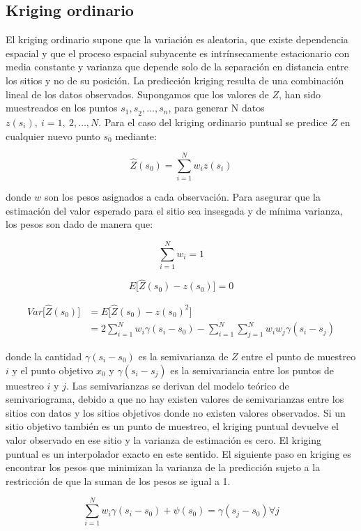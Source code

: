 \documentclass[11pt,b5paper,]{krantz}
\begin{document}
\hypertarget{kriging-ordinario}{%
\subsection{Kriging ordinario}\label{kriging-ordinario}}

El kriging ordinario supone que la variación es aleatoria, que existe dependencia espacial y que el proceso espacial subyacente es intrínsecamente estacionario con media constante y varianza que depende solo de la separación en distancia entre los sitios y no de su posición. La predicción kriging resulta de una combinación lineal de los datos observados. Supongamos que los valores de \(Z\), han sido muestreados en los puntos \(s_1{,s}_2,\ldots,s_n\), para generar N datos \(z(s_i),\ i=1,\ 2,\ldots, N\). Para el caso del kriging ordinario puntual se predice \(Z\) en cualquier nuevo punto \(s_0\) mediante:

\[\hat{Z}(s_0)=\sum_{i=1}^{N}{w_iz(s_i)}\]

donde \(w\) son los pesos asignados a cada observación. Para asegurar que la estimación del valor esperado para el sitio sea insesgada y de mínima varianza, los pesos son dado de manera que:

\[\sum_{i = 1}^{N}{w_i=1}\]

\[E\big[\hat{Z}(s_0)-z(s_0)\big]=0\]

\begin{align*}
Var\big[\hat{Z}(s_0) \big] & = E\big[\hat{Z}(s_0) - z(s_0)^2 \big] \\&= 2\sum_{i=1}^{N}{w_i\gamma(s_i-s_0)-\sum_{i=1}^{N}\sum_{j=1}^{N}{w_iw_j\gamma(s_i-s_j)}}
\end{align*}

donde la cantidad \(\gamma(s_i - s_0)\) es la semivarianza de \(Z\) entre el punto de muestreo \(i\) y el punto objetivo \(x_0\) y \(\gamma(s_i - s_j)\) es la semivariancia entre los puntos de muestreo \(i\) y \(j\). Las semivarianzas se derivan del modelo teórico de semivariograma, debido a que no hay existen valores de semivarianzas entre los sitios con datos y los sitios objetivos donde no existen valores observados. Si un sitio objetivo también es un punto de muestreo, el kriging puntual devuelve el valor observado en ese sitio y la varianza de estimación es cero. El kriging puntual es un interpolador exacto en este sentido. El siguiente paso en kriging es encontrar los pesos que minimizan la varianza de la predicción sujeto a la restricción de que la suman de los pesos se igual a 1.

\[\sum_{i=1}^{N}w_i\gamma(s_i-s_0)+\psi(s_0)=\gamma(s_j-s_0) \forall j\]
\end{document}
